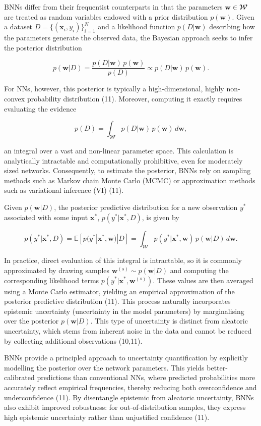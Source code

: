 \documentclass[
  a4paper,
]{scrreprt}
\begin{document}
BNNs differ from their frequentist counterparts in that the parameters
\(\mathbf{w} \in \mathbfcal{W}\) are treated as random variables endowed
with a prior distribution \(p(\mathbf{w})\). Given a dataset
\(D = \{(\mathbf{x}_i, y_i)\}_{i=1}^N\) and a likelihood function
\(p(D | \mathbf{w})\) describing how the parameters generate the
observed data, the Bayesian approach seeks to infer the posterior
distribution

\[
p(\mathbf{w} | D) = \frac{p(D | \mathbf{w})\, p(\mathbf{w})}{p(D)} \propto p(D | \mathbf{w})\, p(\mathbf{w}).
\]

For NNs, however, this posterior is typically a high-dimensional, highly
non-convex probability distribution (11). Moreover, computing it exactly
requires evaluating the evidence

\[
p(D) = \int_{\mathbfcal{W}} p(D | \mathbf{w})\, p(\mathbf{w}) \, d\mathbf{w},
\]

an integral over a vast and non-linear parameter space. This calculation
is analytically intractable and computationally prohibitive, even for
moderately sized networks. Consequently, to estimate the posterior, BNNs
rely on sampling methods such as Markov chain Monte Carlo (MCMC) or
approximation methods such as variational inference (VI) (11).

Given \(p(\mathbf{w} | D)\), the posterior predictive distribution for a
new observation \(y^{*}\) associated with some input \(\mathbf{x}^{*}\),
\(p(y^{*} | \mathbf{x}^{*}, D)\), is given by

\[
p(y^{*} | \mathbf{x}^{*}, D) = \mathbb{E}\!\left[p(y^{*} | \mathbf{x}^{*}, \mathbf{w}) | D\right] 
= \int_{\mathbfcal{W}} p(y^{*} | \mathbf{x}^{*}, \mathbf{w}) \, p(\mathbf{w} | D) \, d\mathbf{w}.
\]

In practice, direct evaluation of this integral is intractable, so it is
commonly approximated by drawing samples
\(\mathbf{w}^{(s)} \sim p(\mathbf{w} | D)\) and computing the
corresponding likelihood terms
\(p(y^{*} | \mathbf{x}^{*}, \mathbf{w}^{(s)})\). These values are then
averaged using a Monte Carlo estimator, yielding an empirical
approximation of the posterior predictive distribution (11). This
process naturally incorporates epistemic uncertainty (uncertainty in the
model parameters) by marginalising over the posterior
\(p(\mathbf{w} | D)\). This type of uncertainty is distinct from
aleatoric uncertainty, which stems from inherent noise in the data and
cannot be reduced by collecting additional observations (10,11).

BNNs provide a principled approach to uncertainty quantification by
explicitly modelling the posterior over the network parameters. This
yields better-calibrated predictions than conventional NNs, where
predicted probabilities more accurately reflect empirical frequencies,
thereby reducing both overconfidence and underconfidence (11). By
disentangle epistemic from aleatoric uncertainty, BNNs also exhibit
improved robustness: for out-of-distribution samples, they express high
epistemic uncertainty rather than unjustified confidence (11).
\end{document}
